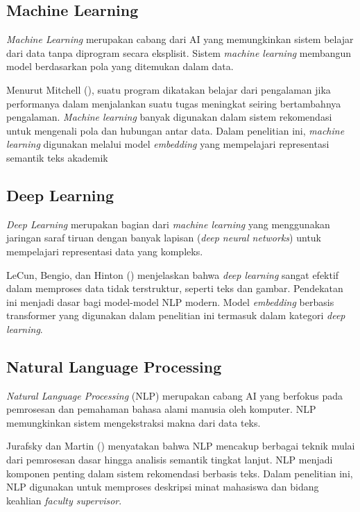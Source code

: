 \subsection{Machine Learning}\label{machine-learning}

\textit{Machine Learning} merupakan cabang dari AI yang memungkinkan sistem belajar dari data tanpa diprogram secara eksplisit. Sistem \textit{machine learning} membangun model berdasarkan pola yang ditemukan dalam data.

Menurut Mitchell (\citeyear{mitchell1997ml}), suatu program dikatakan belajar dari pengalaman jika performanya dalam menjalankan suatu tugas meningkat seiring bertambahnya pengalaman. \textit{Machine learning} banyak digunakan dalam sistem rekomendasi untuk mengenali pola dan hubungan antar data. Dalam penelitian ini, \textit{machine learning} digunakan melalui model \textit{embedding} yang mempelajari representasi semantik teks akademik

\subsection{Deep Learning}\label{deep-learning}

\textit{Deep Learning} merupakan bagian dari \textit{machine learning} yang menggunakan jaringan saraf tiruan dengan banyak lapisan (\textit{deep neural networks}) untuk mempelajari representasi data yang kompleks.

LeCun, Bengio, dan Hinton (\citeyear{lecun2015deep}) menjelaskan bahwa \textit{deep learning} sangat efektif dalam memproses data tidak terstruktur, seperti teks dan gambar. Pendekatan ini menjadi dasar bagi model-model NLP modern. Model \textit{embedding} berbasis transformer yang digunakan dalam penelitian ini termasuk dalam kategori \textit{deep learning}.

\subsection{Natural Language Processing}\label{natural-language-processing}

\textit{Natural Language Processing} (NLP) merupakan cabang AI yang berfokus pada pemrosesan dan pemahaman bahasa alami manusia oleh komputer. NLP memungkinkan sistem mengekstraksi makna dari data teks.

Jurafsky dan Martin (\citeyear{jurafsky2023slp}) menyatakan bahwa NLP mencakup berbagai teknik mulai dari pemrosesan dasar hingga analisis semantik tingkat lanjut. NLP menjadi komponen penting dalam sistem rekomendasi berbasis teks. Dalam penelitian ini, NLP digunakan untuk memproses deskripsi minat mahasiswa dan bidang keahlian \textit{faculty supervisor}.

